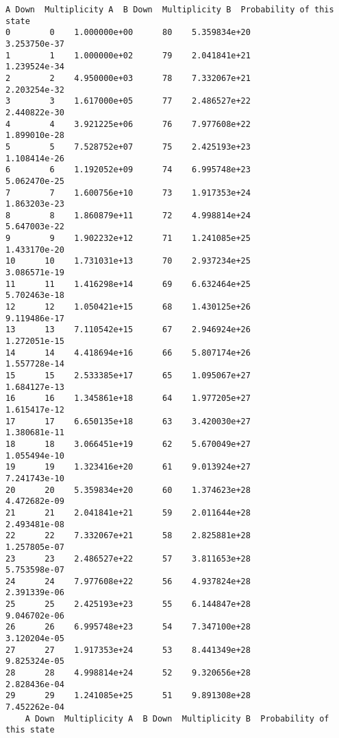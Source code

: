 \documentclass[11pt]{article}
\begin{document}
    \begin{Verbatim}[commandchars=\\\{\}]
    A Down  Multiplicity A  B Down  Multiplicity B  Probability of this state
0        0    1.000000e+00      80    5.359834e+20               3.253750e-37
1        1    1.000000e+02      79    2.041841e+21               1.239524e-34
2        2    4.950000e+03      78    7.332067e+21               2.203254e-32
3        3    1.617000e+05      77    2.486527e+22               2.440822e-30
4        4    3.921225e+06      76    7.977608e+22               1.899010e-28
5        5    7.528752e+07      75    2.425193e+23               1.108414e-26
6        6    1.192052e+09      74    6.995748e+23               5.062470e-25
7        7    1.600756e+10      73    1.917353e+24               1.863203e-23
8        8    1.860879e+11      72    4.998814e+24               5.647003e-22
9        9    1.902232e+12      71    1.241085e+25               1.433170e-20
10      10    1.731031e+13      70    2.937234e+25               3.086571e-19
11      11    1.416298e+14      69    6.632464e+25               5.702463e-18
12      12    1.050421e+15      68    1.430125e+26               9.119486e-17
13      13    7.110542e+15      67    2.946924e+26               1.272051e-15
14      14    4.418694e+16      66    5.807174e+26               1.557728e-14
15      15    2.533385e+17      65    1.095067e+27               1.684127e-13
16      16    1.345861e+18      64    1.977205e+27               1.615417e-12
17      17    6.650135e+18      63    3.420030e+27               1.380681e-11
18      18    3.066451e+19      62    5.670049e+27               1.055494e-10
19      19    1.323416e+20      61    9.013924e+27               7.241743e-10
20      20    5.359834e+20      60    1.374623e+28               4.472682e-09
21      21    2.041841e+21      59    2.011644e+28               2.493481e-08
22      22    7.332067e+21      58    2.825881e+28               1.257805e-07
23      23    2.486527e+22      57    3.811653e+28               5.753598e-07
24      24    7.977608e+22      56    4.937824e+28               2.391339e-06
25      25    2.425193e+23      55    6.144847e+28               9.046702e-06
26      26    6.995748e+23      54    7.347100e+28               3.120204e-05
27      27    1.917353e+24      53    8.441349e+28               9.825324e-05
28      28    4.998814e+24      52    9.320656e+28               2.828436e-04
29      29    1.241085e+25      51    9.891308e+28               7.452262e-04
    A Down  Multiplicity A  B Down  Multiplicity B  Probability of this state

\end{Verbatim}
\end{document}
